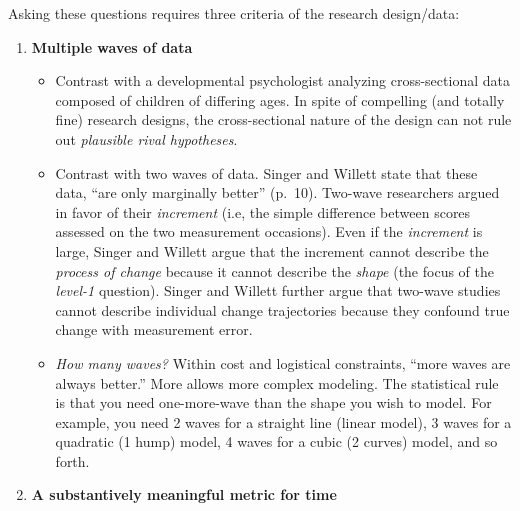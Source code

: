 \documentclass[
  english,
]{book}
\providecommand{\tightlist}{%
  \setlength{\itemsep}{0pt}\setlength{\parskip}{0pt}}
\begin{document}
Asking these questions requires three criteria of the research design/data:

\begin{enumerate}
\def\labelenumi{\arabic{enumi}.}
\tightlist
\item
  \textbf{Multiple waves of data}

  \begin{itemize}
  \tightlist
  \item
    Contrast with a developmental psychologist analyzing cross-sectional data composed of children of differing ages. In spite of compelling (and totally fine) research designs, the cross-sectional nature of the design can not rule out \emph{plausible rival hypotheses}.
  \item
    Contrast with two waves of data. Singer and Willett \citeyearpar{singer_applied_2003} state that these data, ``are only marginally better'' (p.~10). Two-wave researchers argued in favor of their \emph{increment} (i.e, the simple difference between scores assessed on the two measurement occasions). Even if the \emph{increment} is large, Singer and Willett \citeyearpar{singer_applied_2003} argue that the increment cannot describe the \emph{process of change} because it cannot describe the \emph{shape} (the focus of the \emph{level-1} question). Singer and Willett further argue that two-wave studies cannot describe individual change trajectories because they confound true change with measurement error.
  \item
    \emph{How many waves?} Within cost and logistical constraints, ``more waves are always better.'' More allows more complex modeling. The statistical rule is that you need one-more-wave than the shape you wish to model. For example, you need 2 waves for a straight line (linear model), 3 waves for a quadratic (1 hump) model, 4 waves for a cubic (2 curves) model, and so forth.
  \end{itemize}
\item
  \textbf{A substantively meaningful metric for time}


\end{enumerate}
\end{document}
